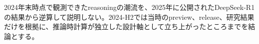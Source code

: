 \begin{claimboundary}
2024年末時点で観測できたreasoningの潮流を、2025年に公開されたDeepSeek-R1の結果から逆算して説明しない。2024-H2では当時のpreview、release、研究結果だけを根拠に、推論時計算が独立した設計軸として立ち上がったところまでを結論とする。\autocite{src-ea823ed75f72}
\end{claimboundary}
